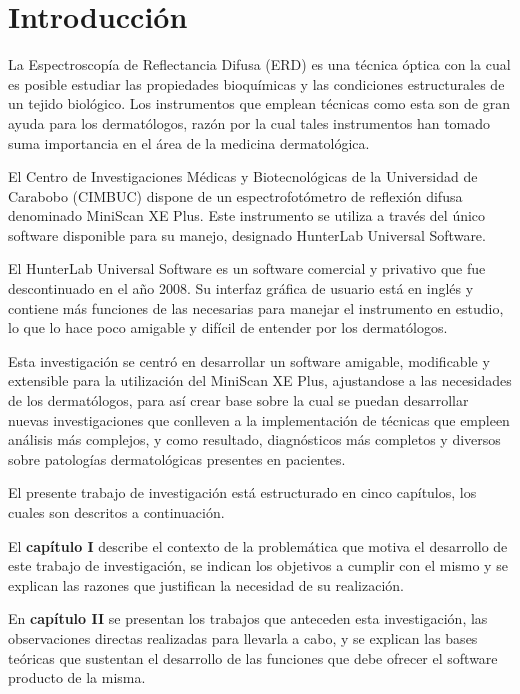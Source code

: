 \chapter*{Introducci\'{o}n}


	La Espectroscop\'{i}a de Reflectancia Difusa (ERD) es una t\'{e}cnica \'{o}ptica con la cual es  posible estudiar las propiedades bioqu\'{i}micas y las condiciones estructurales de un tejido biol\'{o}gico. Los instrumentos que emplean t\'{e}cnicas como esta son de gran ayuda para los dermat\'{o}logos, raz\'{o}n por la cual tales instrumentos han tomado suma importancia en el \'{a}rea de la medicina dermatol\'{o}gica.

El Centro de Investigaciones M\'{e}dicas y Biotecnol\'{o}gicas de la Universidad de Carabobo (CIMBUC) dispone de un espectrofot\'{o}metro de reflexi\'{o}n difusa denominado MiniScan XE Plus. Este instrumento se utiliza a trav\'{e}s del \'{u}nico software disponible para su manejo, designado HunterLab Universal Software.

El HunterLab Universal Software es un software comercial y privativo que fue descontinuado en el a\~{n}o 2008. Su interfaz gr\'{a}fica de usuario est\'{a} en ingl\'{e}s y contiene m\'{a}s funciones de las necesarias para manejar el instrumento en estudio, lo que lo hace poco amigable y dif\'{i}cil de entender por los dermat\'{o}logos.

Esta investigaci\'{o}n se centr\'{o} en desarrollar un software amigable, modificable y extensible para la utilizaci\'{o}n del MiniScan XE Plus, ajustandose a las necesidades de los dermat\'{o}logos, para as\'{i} crear base sobre la cual se puedan desarrollar nuevas investigaciones que conlleven a la implementaci\'{o}n de t\'{e}cnicas que empleen an\'{a}lisis m\'{a}s complejos, y como resultado, diagn\'{o}sticos m\'{a}s completos y diversos sobre patolog\'{i}as dermatol\'{o}gicas presentes en pacientes.

\newpage
\thispagestyle{plain}
	El presente trabajo de investigaci\'{o}n est\'{a} estructurado en cinco cap\'{i}tulos, los cuales son descritos a continuaci\'{o}n.

	El \textbf{cap\'{i}tulo I} describe el contexto de la problem\'{a}tica que motiva el desarrollo de este trabajo de investigaci\'{o}n, se indican los objetivos a cumplir con el mismo y se explican las razones que justifican la necesidad de su realizaci\'{o}n.

	En \textbf{cap\'{i}tulo II} se presentan los trabajos que anteceden esta investigaci\'{o}n, las observaciones directas realizadas para llevarla a cabo, y se explican las bases te\'{o}ricas que sustentan el desarrollo de las funciones que debe ofrecer el software producto de la misma.

